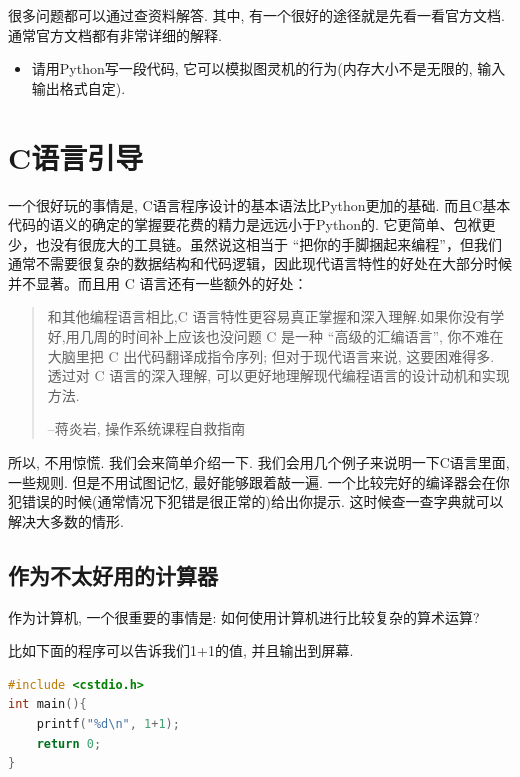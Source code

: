 很多问题都可以通过查资料解答. 其中, 有一个很好的途径就是先看一看官方文档. 通常官方文档都有非常详细的解释. 

\begin{Exercise}
	\begin{itemize}
		\item 请用Python写一段代码, 它可以模拟图灵机的行为(内存大小不是无限的, 输入输出格式自定). 
	\end{itemize}
\end{Exercise}

\section{C语言引导}

一个很好玩的事情是, C语言程序设计的基本语法比Python更加的基础. 而且C基本代码的语义的确定的掌握要花费的精力是远远小于Python的. 它更简单、包袱更少，也没有很庞大的工具链。虽然说这相当于 “把你的手脚捆起来编程”，但我们通常不需要很复杂的数据结构和代码逻辑，因此现代语言特性的好处在大部分时候并不显著。而且用 C 语言还有一些额外的好处：

\begin{quote}
	和其他编程语言相比,C 语言特性更容易真正掌握和深入理解.如果你没有学好,用几周的时间补上应该也没问题
	C 是一种 “高级的汇编语言”, 你不难在大脑里把 C 出代码翻译成指令序列; 但对于现代语言来说, 这要困难得多. 
	透过对 C 语言的深入理解, 可以更好地理解现代编程语言的设计动机和实现方法. 
	
	 \hfill --蒋炎岩, 操作系统课程自救指南 

\end{quote}

所以, 不用惊慌. 我们会来简单介绍一下. 我们会用几个例子来说明一下C语言里面, 一些规则. 但是不用试图记忆, 最好能够跟着敲一遍. 一个比较完好的编译器会在你犯错误的时候(通常情况下犯错是很正常的)给出你提示. 这时候查一查字典就可以解决大多数的情形. 

\subsection{作为不太好用的计算器}
作为计算机, 一个很重要的事情是: 如何使用计算机进行比较复杂的算术运算? 

比如下面的程序可以告诉我们1+1的值, 并且输出到屏幕. 

\begin{lstlisting}[language=C]
#include <cstdio.h>
int main(){
	printf("%d\n", 1+1);
	return 0;
}
\end{lstlisting}

